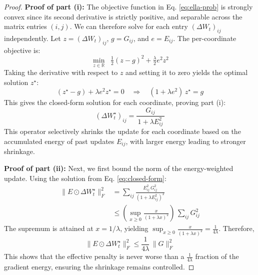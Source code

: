 \begin{proof}
\textbf{Proof of part (i):} The objective function in Eq. \eqref{eq:ella-prob} is strongly convex since its second derivative is strictly positive, and separable across the matrix entries $(i,j)$. We can therefore solve for each entry $(\Delta W_t)_{ij}$ independently. Let $z = (\Delta W_t)_{ij}$, $g = G_{ij}$, and $e = E_{ij}$. The per-coordinate objective is:
\[
\min_{z\in\mathbb{R}} \;\; \tfrac12(z-g)^2 + \tfrac{\lambda}{2} e^2 z^2
\]
Taking the derivative with respect to $z$ and setting it to zero yields the optimal solution $z^\star$:
\[
(z^\star-g) + \lambda e^2 z^\star = 0 \quad \Rightarrow \quad (1+\lambda e^2)\,z^\star = g
\]
This gives the closed-form solution for each coordinate, proving part (i):
\begin{equation}
\label{eq:closed-form}
(\Delta W_t^\star)_{ij} = \frac{G_{ij}}{\,1+\lambda E_{ij}^2\,}
\end{equation}
This operator selectively shrinks the update for each coordinate based on the accumulated energy of past updates $E_{ij}$, with larger energy leading to stronger shrinkage.


\textbf{Proof of part (ii):} Next, we first bound the norm of the energy-weighted update. Using the solution from Eq. \eqref{eq:closed-form}:
\begin{align}
    \|E\odot \Delta W_t^\star\|_F^2
&=
\sum_{ij} \frac{E_{ij}^2\,G_{ij}^2}{(1+\lambda E_{ij}^2)^2} \\
&\le
\left(\sup_{x\ge0} \frac{x}{(1+\lambda x)^2}\right)\, \sum_{ij}G_{ij}^2
\end{align}
The supremum is attained at $x=1/\lambda$, yielding $\sup_{x\ge0} \frac{x}{(1+\lambda x)^2} = \frac{1}{4\lambda}$. Therefore,
\begin{equation}
    \|E\odot \Delta W_t^\star\|_F^2\le\frac{1}{4\lambda}\,\|G\|_F^2
\label{eq:penalty-bound}
\end{equation}
This shows that the effective penalty is never worse than a $\tfrac{1}{4\lambda}$ fraction of the gradient energy, ensuring the shrinkage remains controlled.


\end{proof}

